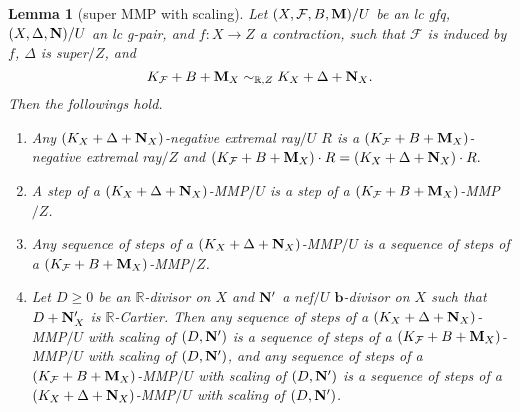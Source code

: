 \documentclass[11pt]{amsart}
\numberwithin{equation}{section}
\newcommand{\bb}{\bm{b}}
\newcommand{\Mm}{{\bf{M}}}
\newcommand{\Nn}{{\bf{N}}}
\newcommand{\Rr}{\mathbb{R}}
\newcommand{\Ff}{\mathcal{F}}
\newtheorem{lem}[thm]{Lemma}
\theoremstyle{definition}
\theoremstyle{definition}
\theoremstyle{definition}
\begin{document}
\begin{lem}[super MMP with scaling]\label{lem: super mmp with scaling}
Let $(X,\Ff,B,\Mm)/U$ be an lc gfq, $(X,\Delta,\Nn)/U$ an lc g-pair, and $f: X\rightarrow Z$ a contraction, such that $\Ff$ is induced by $f$, $\Delta$ is super$/Z$, and
$$K_{\Ff}+B+\Mm_X\sim_{\mathbb R,Z}K_X+\Delta+\Nn_X.$$
Then the followings hold.
\begin{enumerate}
  \item Any $(K_X+\Delta+\Nn_X)$-negative extremal ray$/U$ $R$ is a $(K_{\Ff}+B+\Mm_X)$-negative extremal ray$/Z$ and $(K_{\Ff}+B+\Mm_X)\cdot R=(K_X+\Delta+\Nn_X)\cdot R.$
  \item A step of a $(K_X+\Delta+\Nn_X)$-MMP$/U$ is a step of a $(K_{\Ff}+B+\Mm_X)$-MMP$/Z$.
  \item Any sequence of steps of a $(K_X+\Delta+\Nn_X)$-MMP$/U$ is a sequence of steps of a $(K_{\Ff}+B+\Mm_X)$-MMP$/Z$.
  \item Let $D\geq 0$ be an $\Rr$-divisor on $X$ and $\Nn'$ a nef$/U$ $\bb$-divisor on $X$ such that $D+\Nn'_X$ is $\Rr$-Cartier. Then any sequence of steps of a $(K_X+\Delta+\Nn_X)$-MMP$/U$ with scaling of $(D,\Nn')$ is a sequence of steps of a $(K_{\Ff}+B+\Mm_X)$-MMP$/U$ with scaling of $(D,\Nn')$, and any sequence of steps of a $(K_{\Ff}+B+\Mm_X)$-MMP$/U$ with scaling of $(D,\Nn')$ is a sequence of steps of a $(K_X+\Delta+\Nn_X)$-MMP$/U$ with scaling of $(D,\Nn')$.
\end{enumerate}
\end{lem}
\end{document}
